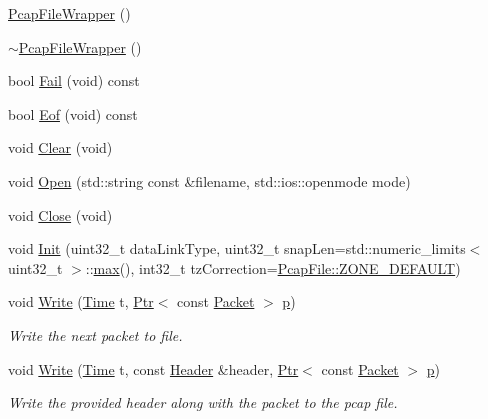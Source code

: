 \begin{DoxyCompactItemize}
\item 
\hyperlink{classns3_1_1PcapFileWrapper_a93d36544051d06b8e9d669c54e1d6da0}{Pcap\+File\+Wrapper} ()
\item 
\hyperlink{classns3_1_1PcapFileWrapper_a7411aab7ddb9e89a8599c03b91cd2337}{$\sim$\+Pcap\+File\+Wrapper} ()
\item 
bool \hyperlink{classns3_1_1PcapFileWrapper_a78e9c467a729b6f5387ba75b09bc8488}{Fail} (void) const 
\item 
bool \hyperlink{classns3_1_1PcapFileWrapper_aab530ce4c968c7e40c9bb790ce7ec1c2}{Eof} (void) const 
\item 
void \hyperlink{classns3_1_1PcapFileWrapper_a31e8c580c9fa3af146badde80dbbc044}{Clear} (void)
\item 
void \hyperlink{classns3_1_1PcapFileWrapper_a351ffbe082feafac5f6fba9ea13f5886}{Open} (std\+::string const \&filename, std\+::ios\+::openmode mode)
\item 
void \hyperlink{classns3_1_1PcapFileWrapper_a3953c7fbf120b889a60969a5ec93a7bc}{Close} (void)
\item 
void \hyperlink{classns3_1_1PcapFileWrapper_a7e8ffc1bba1f4cc7e4efa4c7fca3072d}{Init} (uint32\+\_\+t data\+Link\+Type, uint32\+\_\+t snap\+Len=std\+::numeric\+\_\+limits$<$ uint32\+\_\+t $>$\+::\hyperlink{80211b_8c_affe776513b24d84b39af8ab0930fef7f}{max}(), int32\+\_\+t tz\+Correction=\hyperlink{classns3_1_1PcapFile_abd695588f972dc80b0c928aeda466dc0}{Pcap\+File\+::\+Z\+O\+N\+E\+\_\+\+D\+E\+F\+A\+U\+LT})
\item 
void \hyperlink{classns3_1_1PcapFileWrapper_a00c5afa3a653c6bcfaa37fe35c43675e}{Write} (\hyperlink{classns3_1_1Time}{Time} t, \hyperlink{classns3_1_1Ptr}{Ptr}$<$ const \hyperlink{classns3_1_1Packet}{Packet} $>$ \hyperlink{lte__link__budget__x2__handover__measures_8m_ac9de518908a968428863f829398a4e62}{p})
\begin{DoxyCompactList}\small\item\em Write the next packet to file. \end{DoxyCompactList}\item 
void \hyperlink{classns3_1_1PcapFileWrapper_a925650a4c9db83aacda30dfe89c1f2ec}{Write} (\hyperlink{classns3_1_1Time}{Time} t, const \hyperlink{classns3_1_1Header}{Header} \&header, \hyperlink{classns3_1_1Ptr}{Ptr}$<$ const \hyperlink{classns3_1_1Packet}{Packet} $>$ \hyperlink{lte__link__budget__x2__handover__measures_8m_ac9de518908a968428863f829398a4e62}{p})
\begin{DoxyCompactList}\small\item\em Write the provided header along with the packet to the pcap file. \end{DoxyCompactList}\item 

\end{DoxyCompactItemize}
